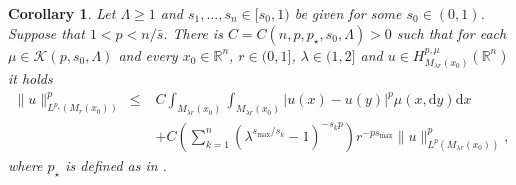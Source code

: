 \documentclass[11pt]{amsart}
\theoremstyle{plain}
\newtheorem{corollary}[theorem]{Corollary}
\theoremstyle{definition}
\numberwithin{equation}{section}
\newcommand{\R}{\mathbb{R}}
\newcommand{\cK}{\mathcal{K}}
\begin{document}
\begin{corollary} \label{thm:sobolev_loc}
Let $\Lambda \ge 1$ and $s_1,\dots,s_n\in[s_0,1)$ be given for some $s_0\in(0,1)$. Suppose that $1 < p < n/\bar{s}$. There is $C = C(n,p,p_{\star},s_0,\Lambda) > 0$ such that for each $\mu \in \cK(p,s_0,\Lambda)$ and every $x_0 \in \R^n$, $r \in (0,1]$, $\lambda \in (1,2]$ and $u \in H^{p,\mu}_{{M_{\lambda r}(x_0)}}(\R^n)$ it holds
\begin{equation*}
\begin{split}
\|u\|_{L^{{p_{\star}}}(M_r(x_0))}^p\
\leq& C \int_{M_{\lambda r}(x_0)} \int_{M_{\lambda r}(x_0)} |u(x)-u(y)|^p \mu(x, \mathrm{d}y) \mathrm{d}x \\
&+ C \left( \sum_{k=1}^n \left( \lambda^{s_{\max}/s_k}-1 \right)^{-s_k p} \right) r^{-ps_{\max}} \|u\|_{L^p(M_{\lambda r}(x_0))}^p,
\end{split}
\end{equation*}
where ${p_{\star}}$ is defined as in .
\end{corollary}
\end{document}
